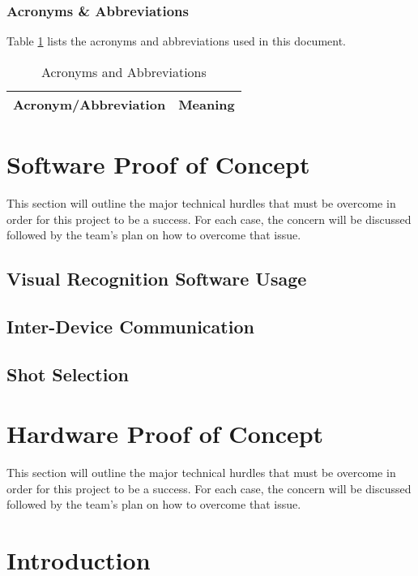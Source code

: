 \documentclass[titlepage]{article}
\begin{document}
\newpage
\subsubsection{Acronyms \& Abbreviations}
Table \ref{tab:Acronyms} lists the acronyms and abbreviations used in this document.
\begin{table}[h!]
\centering
\caption{Acronyms and Abbreviations}
\begin{tabular}{| p{6cm} | p{6cm} |}\hline
	\textbf{Acronym/Abbreviation}	&\textbf{Meaning}\\\hline
\end{tabular}
\label{tab:Acronyms}
\end{table}


\section{Software Proof of Concept}
This section will outline the major technical hurdles that must be overcome in order for this project to be a success. For each case, the concern will be discussed followed by the team's plan on how to overcome that issue.

\subsection{Visual Recognition Software Usage}

\subsection{Inter-Device Communication}

\subsection{Shot Selection}



\section{Hardware Proof of Concept}
This section will outline the major technical hurdles that must be overcome in order for this project to be a success. For each case, the concern will be discussed followed by the team's plan on how to overcome that issue.
 
\section{Introduction}
\end{document}

